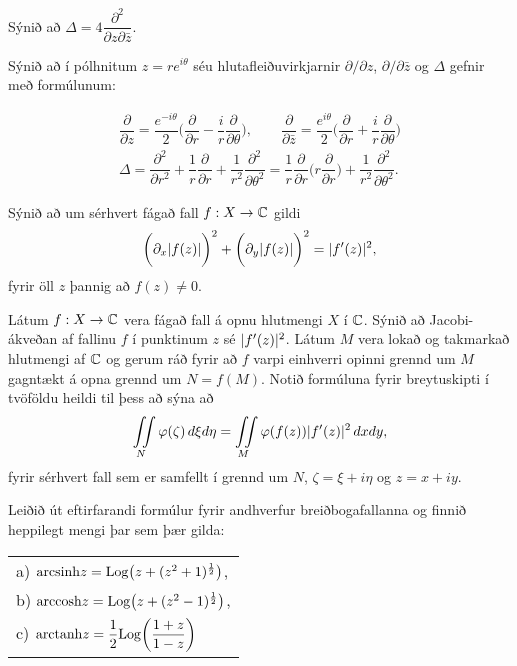 \daemi Sýnið að 
${\Delta}=4\dfrac{{\partial}^2}{{\partial}z{\partial}\bar z}$.


\daemi Sýnið að í pólhnitum $z=re^{i{\theta}}$ séu
hlutafleiðuvirkjarnir  ${\partial}/{\partial}z$,
${\partial}/{\partial}\bar z$ og ${\Delta}$  gefnir með formúlunum:

\begin{gather*} 
\dfrac{\partial}{\partial z} =
\dfrac {e^{-i\theta}}2\bigg(\dfrac{\partial}{\partial r} -\dfrac ir
\dfrac{\partial}{\partial \theta}\bigg), \qquad
\dfrac{\partial}{\partial \bar z} =
\dfrac {e^{i\theta}}2\bigg(\dfrac{\partial}{\partial r} +\dfrac ir
\dfrac{\partial}{\partial \theta}\bigg)\\
\Delta
=\dfrac{\partial^2}{\partial r^2}+\dfrac 1r
\dfrac{\partial}{\partial r}
+\dfrac 1{r^2}\dfrac{\partial^2}{\partial\theta^2}
=\dfrac 1r\dfrac{\partial}{\partial r}\bigg(
r\dfrac{\partial}{\partial r}\bigg) +\dfrac 1{r^2}
\dfrac{\partial^2}{\partial \theta^2}.
\end{gather*}



\daemi Sýnið að um sérhvert fágað fall $f: X\to {\mathbb C}$ gildi
$$
\bigg( {\partial}_x|f(z)|\bigg)^2 +
\bigg( {\partial}_y|f(z)|\bigg)^2 = |f{\sp{\prime}}(z)|^2, 
$$
fyrir  öll $z$ þannig að $f(z)\neq 0$.


\daemi Látum $f:X\to {\mathbb C}$ vera fágað fall á opnu hlutmengi $X$ í ${\mathbb C}$.
Sýnið að Jacobi-ákveðan af fallinu $f$ í punktinum $z$ sé
$|f{\sp{\prime}}(z)|^2$.  Látum $M$ vera lokað og takmarkað hlutmengi af ${\mathbb C}$ og
gerum ráð fyrir að $f$ varpi einhverri opinni grennd um $M$ gagntækt á opna
grennd um $N=f(M)$.  Notið formúluna fyrir breytuskipti í tvöföldu
heildi til þess að sýna að 
$$
\iint\limits_{N}{\varphi}({\zeta})\, d{\xi}d{\eta}=
\iint\limits_{M}\varphi(f(z))|f{\sp{\prime}}(z)|^2\, dxdy,
$$
fyrir sérhvert fall sem er samfellt í grennd um $N$, 
${\zeta}={\xi}+i{\eta}$ og $z=x+iy$.



\daemi Leiðið út eftirfarandi 
formúlur fyrir andhverfur breiðbogafallanna og finnið heppilegt mengi
þar sem þær gilda:

\smallskip
\begin{tabular}{l}
a) ${\operatorname{arcsinh}} z= {\operatorname{Log}} \big( z+(z^2+1)^{\frac 12}\big)$, \\
b) ${\operatorname{arccosh}} z= {\operatorname{Log}} \big( z+(z^2-1)^{\frac 12}\big)$,\\
c) ${\operatorname{arctanh}} z= \dfrac 12 {\operatorname{Log}}\bigg(\dfrac {1+z}{1-z}\bigg)$\\
\end{tabular}


